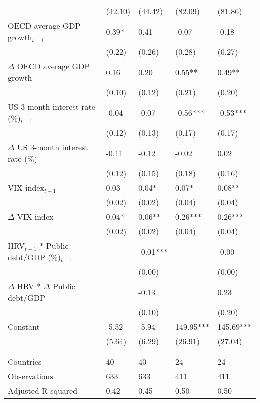 {\begin{tabular}{lp{3cm}p{3cm}p{3cm}p{3cm}}
   & (42.10) & (44.42) & (82.09) & (81.86) \\ 
  OECD average GDP growth$_{t-1}$ & 0.39* & 0.41 & -0.07 & -0.18 \\ 
   & (0.22) & (0.26) & (0.28) & (0.27) \\ 
  $\Delta$ OECD average GDP growth & 0.16 & 0.20 & 0.55** & 0.49** \\ 
   & (0.10) & (0.12) & (0.21) & (0.20) \\ 
  US 3-month interest rate (\%)$_{t-1}$ & -0.04 & -0.07 & -0.56*** & -0.53*** \\ 
   & (0.12) & (0.13) & (0.17) & (0.17) \\ 
  $\Delta$ US 3-month interest rate (\%) & -0.11 & -0.12 & -0.02 & 0.02 \\ 
   & (0.12) & (0.15) & (0.18) & (0.16) \\ 
  VIX index$_{t-1}$ & 0.03 & 0.04* & 0.07* & 0.08** \\ 
   & (0.02) & (0.02) & (0.04) & (0.04) \\ 
  $\Delta$ VIX index & 0.04* & 0.06** & 0.26*** & 0.26*** \\ 
   & (0.02) & (0.02) & (0.04) & (0.04) \\ 
  HRV$_{t-1}$ * Public debt/GDP (\%)$_{t-1}$ &  & -0.01*** &  & -0.00 \\ 
   &  & (0.00) &  & (0.00) \\ 
  $\Delta$ HRV * $\Delta$ Public debt/GDP &  & -0.13 &  & 0.23 \\ 
   &  & (0.10) &  & (0.20) \\ 
  Constant & -5.52 & -5.94 & 149.95*** & 145.69*** \\ 
   & (5.64) & (6.29) & (26.91) & (27.04) \\ 
   &  &  &  &  \\ 
   &  &  &  &  \\ 
  Countries & 40 & 40 & 24 & 24 \\ 
  Observations & 633 & 633 & 411 & 411 \\ 
  Adjusted R-squared & 0.42 & 0.45 & 0.50 & 0.50 \\ 
   \hline
\end{tabular}
}
